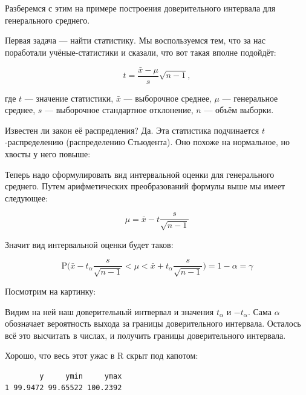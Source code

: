 \documentclass[
  letterpaper,
  DIV=11,
  numbers=noendperiod]{scrreprt}
\newenvironment{Shaded}{}{}
\newcommand{\FunctionTok}[1]{\textcolor[rgb]{0.44,0.26,0.76}{#1}}
\newcommand{\NormalTok}[1]{\textcolor[rgb]{0.14,0.16,0.18}{#1}}
\newcommand{\SpecialCharTok}[1]{\textcolor[rgb]{0.00,0.36,0.77}{#1}}
\theoremstyle{definition}
\theoremstyle{remark}
\begin{document}
Разберемся с этим на примере построения доверительного интервала для
генерального среднего.

Первая задача --- найти статистику. Мы воспользуемся тем, что за нас
поработали учёные-статистики и сказали, что вот такая вполне подойдёт:

\[
t = \frac{\bar x - \mu}{s}\sqrt{n-1},
\]

где \(t\) --- значение статистики, \(\bar x\) --- выборочное среднее,
\(\mu\) --- генеральное среднее, \(s\) --- выборочное стандартное
отклонение, \(n\) --- объём выборки.

Известен ли закон её распредления? Да. Эта статистика подчинается
\(t\)-распределению (распределению Стьюдента). Оно похоже на нормальное,
но хвосты у него повыше:

Теперь надо сформулировать вид интервальной оценки для генерального
среднего. Путем арифметических преобразований формулы выше мы имеет
следующее:

\[
\mu = \bar x - t \frac{s}{\sqrt{n-1}}
\]

Значит вид интервальной оценки будет таков:

\[
\mathrm{P}\Big( \bar x - t_\alpha \frac{s}{\sqrt{n-1}} < \mu < 
\bar x + t_\alpha \frac{s}{\sqrt{n-1}}\Big) = 1 - \alpha = \gamma
\]

Посмотрим на картинку:

Видим на ней наш доверительный интвервал и значения \(t_\alpha\) и
\(-t_\alpha\). Сама \(\alpha\) обозначает вероятность выхода за границы
доверительного интервала. Осталось всё это высчитать в числах, и
получить границы доверительного интервала.

Хорошо, что весь этот ужас в R скрыт под капотом:

\begin{Shaded}
\end{Shaded}

\begin{verbatim}
        y     ymin     ymax
1 99.9472 99.65522 100.2392
\end{verbatim}

\begin{Shaded}
\end{Shaded}
\end{document}
